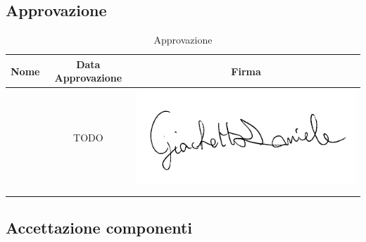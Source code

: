 \subsection{Approvazione}

\renewcommand{\arraystretch}{1}
	\begin{table}[H]
		\begin{center}
			\setlength{\aboverulesep}{0pt}
			\setlength{\belowrulesep}{0pt}
			\setlength{\extrarowheight}{.75ex}
			\begin{tabular}{ c c c}
				\rowcolor{AzzurroGruppo!30} 
				\textbf{Nome} & \textbf{Data Approvazione} & \textbf{Firma} \\
				\toprule
				
				\Daniele{} & TODO & \includegraphics[scale = 0.16]{components/img/firme_membri/firma-dg.png} \\
				\Tullio{} & & \\
				\Riccardo{} & & \\
				
				\bottomrule
			\end{tabular}
			\caption{Approvazione}
		\end{center}
    \end{table}

\subsection{Accettazione componenti}

